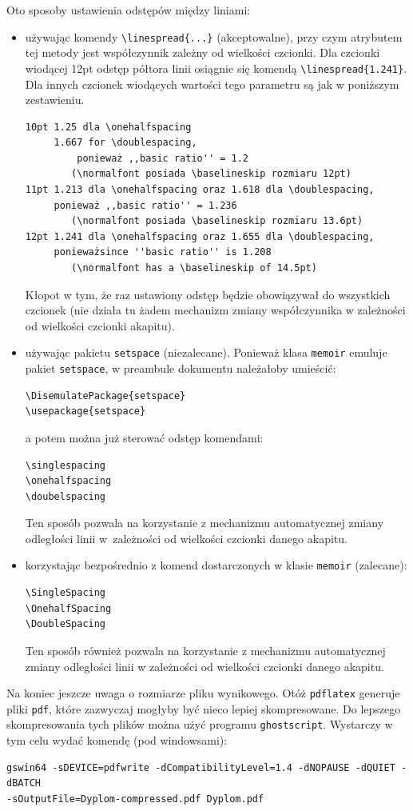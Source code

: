 Oto sposoby ustawienia odstępów między liniami:
\begin{itemize}
\item używając komendy \verb+\linespread{...}+ (akceptowalne), przy czym atrybutem tej metody jest współczynnik zależny od wielkości
czcionki.  Dla czcionki wiodącej 12pt odstęp półtora linii osiągnie się komendą \verb+\linespread{1.241}+. Dla innych czcionek wiodących wartości tego parametru są jak w poniższym zestawieniu.
\begin{lstlisting}[basicstyle=\footnotesize\ttfamily]
10pt 1.25 dla \onehalfspacing 
     1.667 for \doublespacing, 
		 ponieważ ,,basic ratio'' = 1.2 
		(\normalfont posiada \baselineskip rozmiaru 12pt)
11pt 1.213 dla \onehalfspacing oraz 1.618 dla \doublespacing, 
     ponieważ ,,basic ratio'' = 1.236 
		(\normalfont posiada \baselineskip rozmiaru 13.6pt)
12pt 1.241 dla \onehalfspacing oraz 1.655 dla \doublespacing, 
     ponieważsince ''basic ratio'' is 1.208 
		(\normalfont has a \baselineskip of 14.5pt)
\end{lstlisting}
Kłopot w tym, że raz ustawiony odstęp będzie obowiązywał do wszystkich czcionek (nie działa tu żadem mechanizm zmiany współczynnika w zależności od wielkości czcionki akapitu).

\item używając pakietu \texttt{setspace} (niezalecane). Ponieważ klasa \texttt{memoir} emuluje pakiet \texttt{setspace}, w preambule dokumentu należałoby umieścić:
\begin{lstlisting}[basicstyle=\footnotesize\ttfamily]
\DisemulatePackage{setspace}
\usepackage{setspace}
\end{lstlisting}
a potem można już sterować odstęp komendami:
\begin{lstlisting}[basicstyle=\footnotesize\ttfamily]
\singlespacing
\onehalfspacing
\doubelspacing
\end{lstlisting}
Ten sposób pozwala na korzystanie z mechanizmu automatycznej zmiany odległości linii w~zależności od wielkości czcionki danego akapitu.
\item korzystając bezpośrednio z komend dostarczonych w klasie \texttt{memoir} (zalecane):
\begin{lstlisting}[basicstyle=\footnotesize\ttfamily]
\SingleSpacing
\OnehalfSpacing
\DoubleSpacing
\end{lstlisting}
Ten sposób również pozwala na korzystanie z mechanizmu automatycznej zmiany odległości linii w zależności od wielkości czcionki danego akapitu.
\end{itemize}

Na koniec jeszcze uwaga o rozmiarze pliku wynikowego. Otóż \texttt{pdflatex} generuje pliki \texttt{pdf}, które zazwyczaj mogłyby być nieco lepiej
skompresowane. Do lepszego skompresowania tych plików można użyć programu \texttt{ghostscript}. Wystarczy w tym celu wydać komendę (pod windowsami):
\begin{lstlisting}[basicstyle=\footnotesize\ttfamily]
gswin64 -sDEVICE=pdfwrite -dCompatibilityLevel=1.4 -dNOPAUSE -dQUIET -dBATCH 
-sOutputFile=Dyplom-compressed.pdf Dyplom.pdf
\end{lstlisting}
